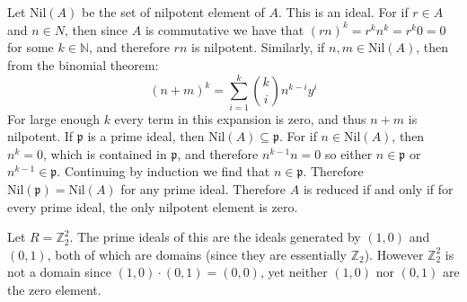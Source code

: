 \documentclass[crop=false,class=article]{standalone}                           %
\begin{document}
    \section{}
        Let $\textrm{Nil}(A)$ be the set of nilpotent element of $A$. This is an
        ideal. For if $r\in{A}$ and $n\in{N}$, then since $A$ is commutative we
        have that $(rn)^{k}=r^{k}n^{k}=r^{k}0=0$ for some $k\in\mathbb{N}$, and
        therefore $rn$ is nilpotent. Similarly, if $n,m\in\textrm{Nil}(A)$, then
        from the binomial theorem:
        \begin{equation}
            (n+m)^{k}=\sum_{i=1}^{k}\binom{k}{i}n^{k-i}y^{i}
        \end{equation}
        For large enough $k$ every term in this expansion is zero, and thus
        $n+m$ is nilpotent. If $\mathfrak{p}$ is a prime ideal, then
        $\textrm{Nil}(A)\subseteq\mathfrak{p}$. For if $n\in\textrm{Nil}(A)$,
        then $n^{k}=0$, which is contained in $\mathfrak{p}$, and therefore
        $n^{k-1}n=0$ so either $n\in\mathfrak{p}$ or $n^{k-1}\in\mathfrak{p}$.
        Continuing by induction we find that $n\in\mathfrak{p}$. Therefore
        $\textrm{Nil}(\mathfrak{p})=\textrm{Nil}(A)$ for any prime ideal.
        Therefore $A$ is reduced if and only if for every prime ideal, the
        only nilpotent element is zero.
        \par\hfill\par
        Let $R=\mathbb{Z}_{2}^{2}$. The prime ideals of this are the ideals
        generated by $(1,0)$ and $(0,1)$, both of which are domains
        (since they are essentially $\mathbb{Z}_{2}$). However
        $\mathbb{Z}_{2}^{2}$ is not a domain since $(1,0)\cdot(0,1)=(0,0)$,
        yet neither $(1,0)$ nor $(0,1)$ are the zero element.
\end{document}
